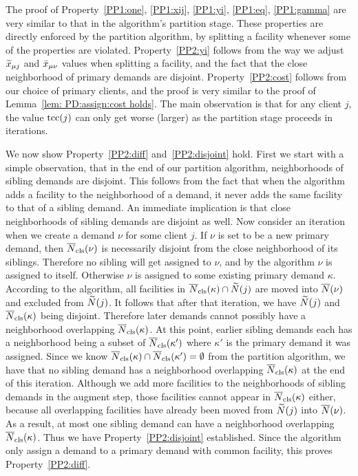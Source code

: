 \documentclass[11pt]{article}
\begin{document}
  The proof of
Property~\ref{PP1:one}, \ref{PP1:xij}, \ref{PP1:yi},
\ref{PP1:eq}, \ref{PP1:gamma} are very similar to that in
the {\EGUP} algorithm's partition stage. These properties
are directly enforced by the partition algorithm, by
splitting a facility whenever some of the properties are
violated. Property~\ref{PP2:yi} follows from the way we
adjust ${\widetilde x}_{\mu j}$ and ${\bar x}_{\mu \nu}$ values when
splitting a facility, and the fact that the close
neighborhood of primary demands are
disjoint. Property~\ref{PP2:cost} follows from our choice of
primary clients, and the proof is very similar to the proof
of Lemma~\ref{lem: PD:assign:cost holds}. The main
observation is that for any client $j$, the value $\textrm{tcc}(j)$
can only get worse (larger) as the partition stage proceeds
in iterations.

We now show Property~\ref{PP2:diff} and~\ref{PP2:disjoint}
hold. First we start with a simple observation, that in the
end of our partition algorithm, neighborhoods of sibling
demands are disjoint. This follows from the fact that when
the algorithm adds a facility to the neighborhood of a
demand, it never adds the same facility to that of a sibling
demand. An immediate implication is that close neighborhoods
of sibling demands are disjoint as well. Now consider an
iteration when we create a demand $\nu$ for some client
$j$. If $\nu$ is set to be a new primary demand, then
${\overline{N}}_{\text{cls}}(\nu)$ is necessarily disjoint from the close
neighborhood of its siblings. Therefore no sibling will get
assigned to $\nu$, and by the algorithm $\nu$ is assigned to
itself. Otherwise $\nu$ is assigned to some existing primary
demand $\kappa$. According to the algorithm, all facilities
in ${\overline{N}}_{\text{cls}}(\kappa) \cap {\widetilde N}(j)$ are moved into
${\overline{N}}(\nu)$ and excluded from ${\widetilde N}(j)$. It follows
that after that iteration, we have ${\widetilde N}(j)$ and
${\overline{N}}_{\text{cls}}(\kappa)$ being disjoint. Therefore later demands
cannot possibly have a neighborhood overlapping
${\overline{N}}_{\text{cls}}(\kappa)$. At this point, earlier sibling demands
each has a neighborhood being a subset of
${\overline{N}}_{\text{cls}}(\kappa')$ where $\kappa'$ is the primary demand
it was assigned. Since we know ${\overline{N}}_{\text{cls}}(\kappa)\cap
{\overline{N}}_{\text{cls}}(\kappa')=\emptyset$ from the partition algorithm,
we have that no sibling demand has a neighborhood
overlapping ${\overline{N}}_{\text{cls}}(\kappa)$ at the end of this
iteration. Although we add more facilities to the
neighborhoods of sibling demands in the augment step, those
facilities cannot appear in ${\overline{N}}_{\text{cls}}(\kappa)$ either,
because all overlapping facilities have already been moved
from ${\widetilde N}(j)$ into ${\overline{N}}(\nu)$. As a result, at most
one sibling demand can have a neighborhood overlapping
${\overline{N}}_{\text{cls}}(\kappa)$. Thus we have
Property~\ref{PP2:disjoint} established. Since the algorithm
only assign a demand to a primary demand with common
facility, this proves Property~\ref{PP2:diff}.
\end{document}

